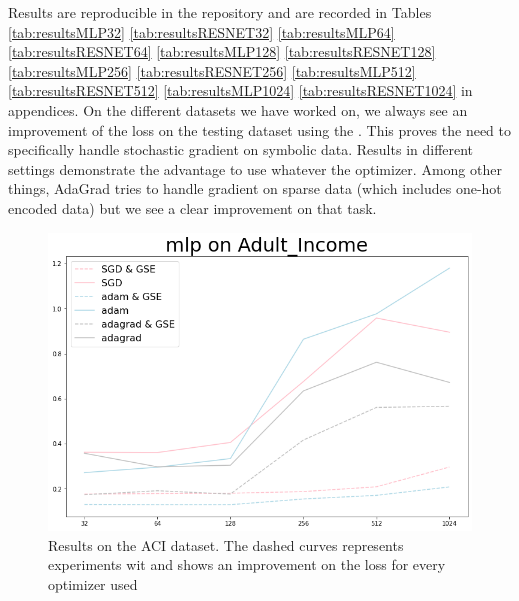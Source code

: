 Results are reproducible in the repository and are recorded in Tables \ref{tab:resultsMLP32} \ref{tab:resultsRESNET32} \ref{tab:resultsMLP64} \ref{tab:resultsRESNET64} \ref{tab:resultsMLP128}  \ref{tab:resultsRESNET128} \ref{tab:resultsMLP256} \ref{tab:resultsRESNET256} \ref{tab:resultsMLP512} \ref{tab:resultsRESNET512} \ref{tab:resultsMLP1024}      \ref{tab:resultsRESNET1024} in appendices. On the different datasets we have worked on, we always see an improvement of the loss on the testing dataset using the \tecname. This proves the need to specifically handle stochastic gradient on symbolic data. Results in different settings demonstrate the advantage to use \tecname whatever the optimizer. Among other things, AdaGrad tries to handle gradient on sparse data (which includes one-hot encoded data) but we see a clear improvement on that task.



\begin{figure}[h!]
  \centering
  \includegraphics[width=0.7\linewidth]{figures/AdultIncomelossResults.png}
  \caption{Results on the ACI dataset. The dashed curves represents experiments wit \tecnameAbrv  and shows an improvement on the loss for every optimizer used}
  \label{fig:}
\end{figure}




